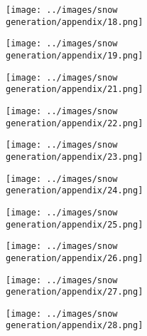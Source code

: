 \begin{figure}[H]
\begin{subfigure}[b]{0.1\textwidth}
 \centering
 \texttt{[image: ../images/snow generation/appendix/18.png]}
\end{subfigure}
\hspace{1em}%
\begin{subfigure}[b]{0.1\textwidth}
 \centering
 \texttt{[image: ../images/snow generation/appendix/19.png]}
\end{subfigure}
\hspace{1em}%
\begin{subfigure}[b]{0.1\textwidth}
\centering
\texttt{[image: ../images/snow generation/appendix/21.png]}
\end{subfigure}
\hspace{1em}%
\begin{subfigure}[b]{0.1\textwidth}
 \centering
 \texttt{[image: ../images/snow generation/appendix/22.png]}
\end{subfigure}
\hspace{1em}%
\begin{subfigure}[b]{0.1\textwidth}
 \centering
 \texttt{[image: ../images/snow generation/appendix/23.png]}
\end{subfigure}
\hspace{1em}%
\begin{subfigure}[b]{0.1\textwidth}
 \centering
 \texttt{[image: ../images/snow generation/appendix/24.png]}
\end{subfigure}
\hspace{1em}%
\begin{subfigure}[b]{0.1\textwidth}
\centering
\texttt{[image: ../images/snow generation/appendix/25.png]}
\end{subfigure}
\hspace{1em}%
\begin{subfigure}[b]{0.1\textwidth}
 \centering
 \texttt{[image: ../images/snow generation/appendix/26.png]}
\end{subfigure}
\hspace{1em}%
\begin{subfigure}[b]{0.1\textwidth}
 \centering
 \texttt{[image: ../images/snow generation/appendix/27.png]}
\end{subfigure}
\hspace{1em}%
\begin{subfigure}[b]{0.1\textwidth}
 \centering
 \texttt{[image: ../images/snow generation/appendix/28.png]}

\end{subfigure}
\end{figure}
